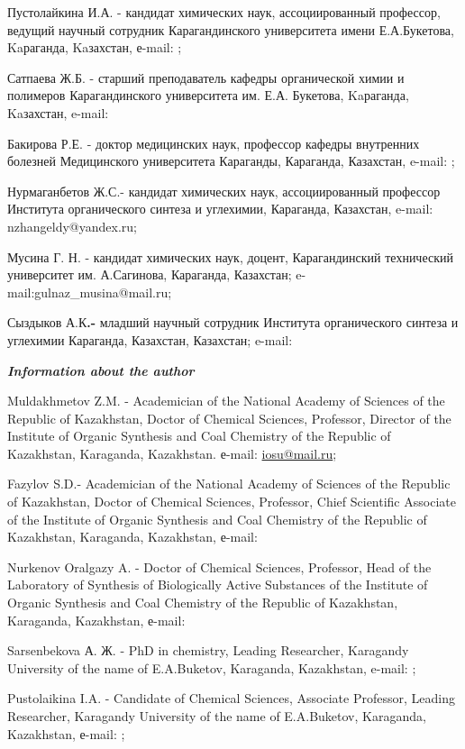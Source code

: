 Пустолайкина И.А. - кандидат химических наук, ассоциированный
профессор, ведущий научный сотрудник Карагандинского университета имени
Е.А.Букетова, Kaраганда, Kaзахстан, е-mail:
\href{mailto:ipustolaikina@gmail.com}{};

Сатпаева Ж.Б. - старший преподаватель кафедры органической
химии и полимеров Карагандинского университета им. Е.А. Букетова,
Kaраганда, Kaзахстан, e-mail:


Бакирова Р.Е. - доктор медицинских наук, профессор кафедры
внутренних болезней Медицинского университета Караганды, Караганда,
Казахстан, e-mail: \href{mailto:bakir15@mail.ru}{};

Нурмаганбетов Ж.С.- кандидат химических наук, ассоциированный
профессор Института органического синтеза и углехимии, Караганда,
Казахстан, e-mail: nzhangeldy@yandex.ru;

Мусина Г. Н. - кандидат химических наук, доцент, Карагандинский
технический университет им. А.Сагинова, Караганда, Казахстан;
e-mail:gulnaz\_musina@mail.ru;

Сыздыков А.К{\bfseries .-} младший научный сотрудник Института
органического синтеза и углехимии Караганда, Казахстан, Казахстан;
e-mail:
\href{mailto:ardak.syzdykov.96@inbox.ru}{}

\emph{{\bfseries Information about the author}}

Muldakhmetov Z.M. - Academician of the National Academy of Sciences of
the Republic of Kazakhstan, Doctor of Chemical Sciences, Professor,
Director of the Institute of Organic Synthesis and Coal Chemistry of the
Republic of Kazakhstan, Karaganda, Kazakhstan. е-mail:
\href{mailto:iosu8990@mail.ru}{iosu@mail.ru};

Fazylov S.D.- Academician of the National Academy of Sciences of the
Republic of Kazakhstan, Doctor of Chemical Sciences, Professor, Chief
Scientific Associate of the Institute of Organic Synthesis and Coal
Chemistry of the Republic of Kazakhstan, Karaganda, Kazakhstan, е-mail:


Nurkenov Oralgazy A. - Doctor of Chemical Sciences, Professor, Head of
the Laboratory of Synthesis of Biologically Active Substances of the
Institute of Organic Synthesis and Coal Chemistry of the Republic of
Kazakhstan, Karaganda, Kazakhstan, е-mail:


Sarsenbekova А. Ж. - PhD in chemistry, Leading Researcher, Karagandy
University of the name of E.A.Buketov, Karaganda, Kazakhstan, e-mail:
\href{mailto:chem_akmaral@mail.ru}{};

Pustolaikina I.A. - Candidate of Chemical Sciences, Associate
Professor, Leading Researcher, Karagandy University of the name of
E.A.Buketov, Karaganda, Kazakhstan, е-mail:
\href{mailto:ipustolaikina@gmail.com}{};

